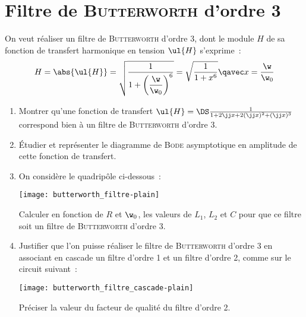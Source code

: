 \documentclass[a4paper, 12pt, final, garamond]{book}
\begin{document}
\section{Filtre de \textsc{Butterworth} d'ordre 3}
On veut réaliser un filtre de \textsc{Butterworth} d'ordre 3, dont le module $H$
de sa fonction de transfert harmonique en tension $\ul{H}$ s'exprime~:
\[H = \abs{\ul{H}} = \sqrt{\frac{1}{1+\left(\dfrac{\w}{\w_0}\right)^6}} =
    \sqrt{\frac{1}{1+x^6}}
    \qavec
    x = \frac{\w}{\w_0}
\]
\begin{enumerate}
    \item Montrer qu'une fonction de transfert $\ul{H} = \DS \frac{1}{1+2\jj x +
        2(\jj x)^2 + (\jj x)^3}$ correspond bien à un filtre de
        \textsc{Butterworth} d'ordre 3.
    \item Étudier et représenter le diagramme de \textsc{Bode} asymptotique en
        amplitude de cette fonction de transfert.
    \item On considère le quadripôle ci-dessous~:
        \begin{center}
            \texttt{[image: butterworth\_filtre-plain]}
        \end{center}
        Calculer en fonction de $R$ et $\w_0$, les valeurs de $L_1$, $L_2$ et
        $C$ pour que ce filtre soit un filtre de \textsc{Butterworth} d'ordre 3.
    \item Justifier que l'on puisse réaliser le filtre de \textsc{Butterworth}
        d'ordre 3 en associant en cascade un filtre d'ordre 1 et un filtre
        d'ordre 2, comme sur le circuit suivant~:
        \begin{center}
            \texttt{[image: butterworth\_filtre\_cascade-plain]}
        \end{center}
        Préciser la valeur du facteur de qualité du filtre d'ordre 2.
\end{enumerate}
\end{document}
